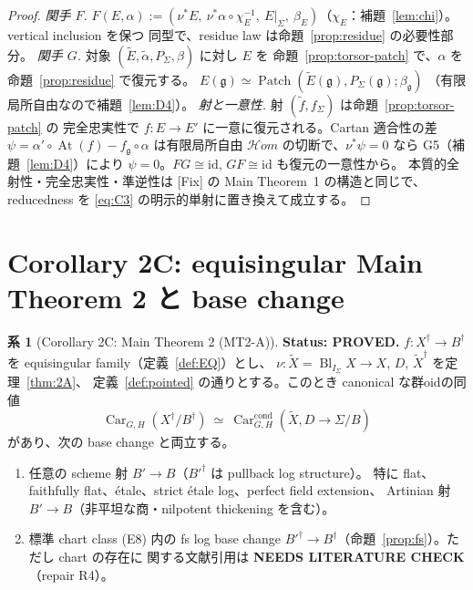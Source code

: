 \documentclass[11pt,a4paper]{article}
\numberwithin{equation}{section}
\theoremstyle{definition}
\newtheorem{corollary}[definition]{系}
\DeclareMathOperator{\At}{At}
\DeclareMathOperator{\Bl}{Bl}
\newcommand{\g}{\mathfrak g}
\newcommand{\tX}{\widetilde X}
\newcommand{\tE}{\widetilde E}
\newcommand{\tal}{\widetilde\alpha}
\newcommand{\Car}{\operatorname{Car}}
\begin{document}
\begin{proof}
\emph{関手 $F$.} $F(E,\alpha):=(\nu^*E,\ \nu^*\alpha\circ\chi_E^{-1},\
E|_\Sigma,\ \beta_E)$（$\chi_E$：補題~\ref{lem:chi}）。vertical inclusion を保つ
同型で、residue law は命題~\ref{prop:residue} の必要性部分。
\emph{関手 $G$.} 対象 $(\tE,\tal,P_\Sigma,\beta)$ に対し $E$ を
命題~\ref{prop:torsor-patch} で、$\alpha$ を命題~\ref{prop:residue} で復元する。
$E(\g)\simeq\operatorname{Patch}(\tE(\g),P_\Sigma(\g);\beta_\g)$
（有限局所自由なので補題~\ref{lem:D4}）。
\emph{射と一意性.} 射 $(\tilde f,f_\Sigma)$ は命題~\ref{prop:torsor-patch} の
完全忠実性で $f:E\to E'$ に一意に復元される。Cartan 適合性の差
$\psi=\alpha'\circ\At(f)-f_\g\circ\alpha$ は有限局所自由
$\mathcal Hom$ の切断で、$\nu^*\psi=0$ なら G5（補題~\ref{lem:D4}）により
$\psi=0$。$FG\cong\mathrm{id}$, $GF\cong\mathrm{id}$ も復元の一意性から。
本質的全射性・完全忠実性・準逆性は [Fix] の Main Theorem~1 の構造と同じで、
reducedness を \eqref{eq:C3} の明示的単射に置き換えて成立する。
\end{proof}

\section{Corollary 2C: equisingular Main Theorem 2 と base change}\label{sec:2C}

\begin{corollary}[Corollary 2C: Main Theorem 2 (MT2-A)]\label{cor:2C}
\textbf{Status: PROVED.}
$f:X^\dagger\to B^\dagger$ を equisingular family（定義~\ref{def:EQ}）とし、
$\nu:\tX=\Bl_{I_\Sigma}X\to X$, $D$, $\tX^\dagger$ を定理~\ref{thm:2A}、
定義~\ref{def:pointed} の通りとする。このとき canonical な群oidの同値
\[
  \boxed{\ \Car_{G,H}(X^\dagger/B^\dagger)\ \simeq\
  \Car^{\mathrm{cond}}_{G,H}(\tX,D\to\Sigma/B)\ }
\]
があり、次の base change と両立する。
\begin{enumerate}[label=(\roman*)]
\item 任意の scheme 射 $B'\to B$（$B'^\dagger$ は pullback log structure）。
  特に flat、faithfully flat、étale、strict étale log、perfect field extension、
  Artinian 射 $B'\to B$（非平坦な商・nilpotent thickening を含む）。
\item 標準 chart class (E8) 内の fs log base change
  $B'^\dagger\to B^\dagger$（命題~\ref{prop:fs}）。ただし chart の存在に
  関する文献引用は \textbf{NEEDS LITERATURE CHECK}（repair R4）。
\end{enumerate}
\end{corollary}
\end{document}
